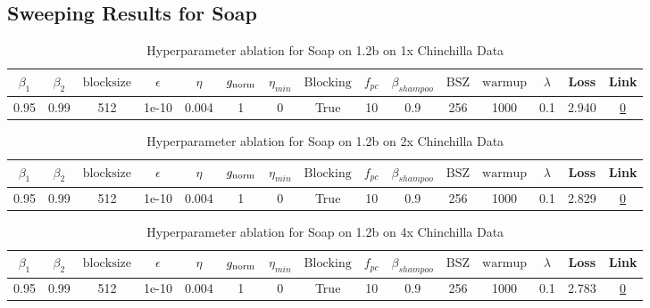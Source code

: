 \subsection{Sweeping Results for Soap}%
\begin{table}[H]
\centering
\caption{Hyperparameter ablation for Soap on 1.2b on 1x Chinchilla Data}
\label{tab:ablation_soap_1.2b_on_1x_chinchilla_data}
\begin{tabular}{ccccccccccccccc}
\toprule
$\beta_1$ & $\beta_2$ & $\mathrm{block size}$ & $\epsilon$ & $\eta$ & $g_{\mathrm{norm}}$ & $\eta_{min}$ & $\mathrm{Blocking}$ & $f_{pc}$ & $\beta_{shampoo}$ & $\mathrm{BSZ}$ & $\mathrm{warmup}$ & $\lambda$ & Loss & Link \\
\midrule
0.95 & 0.99 & 512 & 1e-10 & 0.004 & 1 & 0 & True & 10 & 0.9 & 256 & 1000 & 0.1 & 2.940 & \href{https://wandb.ai/marin-community/optimizer-scaling/runs/sweep-1.2b-24B-soapebf16d04f58lr0.004-wd0.1-minlr0.0-warmup1000--82b8d3}{0} \\
\midrule
\bottomrule
\end{tabular}
\end{table}

\begin{table}[H]
\centering
\caption{Hyperparameter ablation for Soap on 1.2b on 2x Chinchilla Data}
\label{tab:ablation_soap_1.2b_on_2x_chinchilla_data}
\begin{tabular}{ccccccccccccccc}
\toprule
$\beta_1$ & $\beta_2$ & $\mathrm{block size}$ & $\epsilon$ & $\eta$ & $g_{\mathrm{norm}}$ & $\eta_{min}$ & $\mathrm{Blocking}$ & $f_{pc}$ & $\beta_{shampoo}$ & $\mathrm{BSZ}$ & $\mathrm{warmup}$ & $\lambda$ & Loss & Link \\
\midrule
0.95 & 0.99 & 512 & 1e-10 & 0.004 & 1 & 0 & True & 10 & 0.9 & 256 & 1000 & 0.1 & 2.829 & \href{https://wandb.ai/marin-community/optimizer-scaling/runs/sweep-1.2b-48B-soapeweightf32ae127elr0.004-wd0.1-minlr0.0-warmup-000547}{0} \\
\midrule
\bottomrule
\end{tabular}
\end{table}

\begin{table}[H]
\centering
\caption{Hyperparameter ablation for Soap on 1.2b on 4x Chinchilla Data}
\label{tab:ablation_soap_1.2b_on_4x_chinchilla_data}
\begin{tabular}{ccccccccccccccc}
\toprule
$\beta_1$ & $\beta_2$ & $\mathrm{block size}$ & $\epsilon$ & $\eta$ & $g_{\mathrm{norm}}$ & $\eta_{min}$ & $\mathrm{Blocking}$ & $f_{pc}$ & $\beta_{shampoo}$ & $\mathrm{BSZ}$ & $\mathrm{warmup}$ & $\lambda$ & Loss & Link \\
\midrule
0.95 & 0.99 & 512 & 1e-10 & 0.004 & 1 & 0 & True & 10 & 0.9 & 256 & 1000 & 0.1 & 2.783 & \href{https://wandb.ai/marin-community/optimizer-scaling/runs/sweep-1.2b-96B-soapeweightf321bf579lr0.004-wd0.1-minlr0.0-warmup-7fd4b6}{0} \\
\midrule
\bottomrule
\end{tabular}
\end{table}

